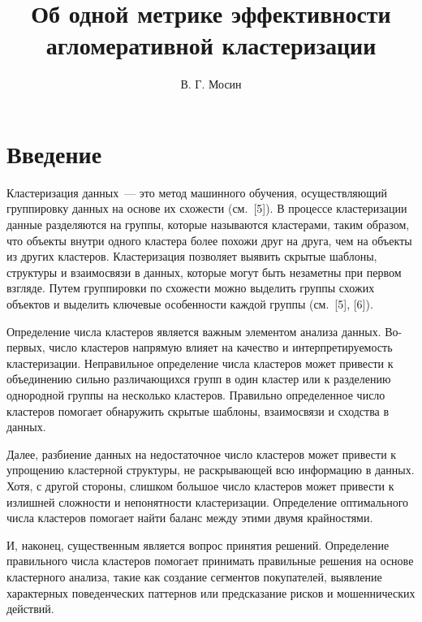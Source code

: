 \documentclass[a4paper,12pt]{article}
\title{Об одной метрике эффективности агломеративной кластеризации }
\author{В. Г. Мосин}
\date{}
\begin{document}
	\maketitle
	
\tableofcontents
	
\section{Введение}
Кластеризация данных — это метод машинного обучения, осуществляющий группировку данных на основе их схожести (см. [5]). В процессе кластеризации данные разделяются на группы, которые называются кластерами, таким образом, что объекты внутри одного кластера более похожи друг на друга, чем на объекты из других кластеров. Кластеризация позволяет выявить скрытые шаблоны, структуры и взаимосвязи в данных, которые могут быть незаметны при первом взгляде. Путем группировки по схожести можно выделить группы схожих объектов и выделить ключевые особенности каждой группы (см. [5], [6]).

Определение числа кластеров является важным элементом анализа данных. 
Во-первых, число кластеров напрямую влияет на качество и интерпретируемость кластеризации. Неправильное определение числа кластеров может привести к объединению сильно различающихся групп в один кластер или к разделению однородной группы на несколько кластеров. Правильно определенное число кластеров помогает обнаружить скрытые шаблоны, взаимосвязи и сходства в данных. 

Далее, разбиение данных на недостаточное число кластеров может привести к упрощению кластерной структуры, не раскрывающей всю информацию в данных. Хотя, с другой стороны, слишком большое число кластеров может привести к излишней сложности и непонятности кластеризации. Определение оптимального числа кластеров помогает найти баланс между этими двумя крайностями. 

И, наконец, существенным является вопрос принятия решений. Определение правильного числа кластеров помогает принимать правильные решения на основе кластерного анализа, такие как создание сегментов покупателей, выявление характерных поведенческих паттернов или предсказание рисков и мошеннических действий.
\end{document}
